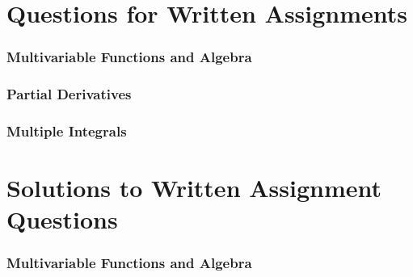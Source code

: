 \documentclass{article}
\begin{document}
\maketitle  %
\newpage
\tableofcontents
\newpage
\part{Questions for Written Assignments}
\setcounter{section}{1}
\section{Multivariable Functions and Algebra}
\newpage %
\section{Partial Derivatives} %
\newpage %
\section{Multiple Integrals}





\newpage
\part{Solutions to Written Assignment Questions}
\setcounter{section}{1}

\section{Multivariable Functions and Algebra}
 \newpage %
 \newpage %
 \newpage %
 \newpage %
 \newpage %
 \newpage %
 \newpage %
\end{document}

